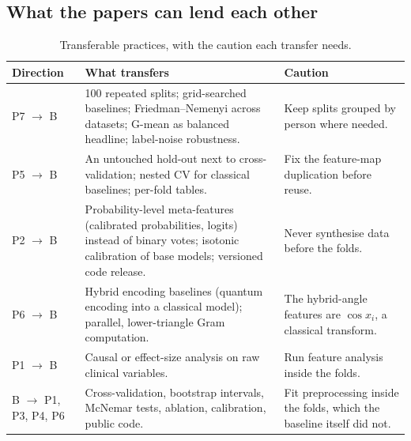 \documentclass[11pt,a4paper]{article}
\begin{document}
\subsection{What the papers can lend each other}
\label{sec:lessons}
\begin{table}[H]
\centering\footnotesize
\caption{Transferable practices, with the caution each transfer needs.}
\begin{tabularx}{\textwidth}{L{2.6cm} Y Y}
\toprule
Direction & What transfers & Caution \\
\midrule
P7 $\to$ B & 100 repeated splits; grid-searched baselines; Friedman--Nemenyi across datasets; G-mean as balanced headline; label-noise robustness. & Keep splits grouped by person where needed. \\
P5 $\to$ B & An untouched hold-out next to cross-validation; nested CV for classical baselines; per-fold tables. & Fix the feature-map duplication before reuse. \\
P2 $\to$ B & Probability-level meta-features (calibrated probabilities, logits) instead of binary votes; isotonic calibration of base models; versioned code release. & Never synthesise data before the folds. \\
P6 $\to$ B & Hybrid encoding baselines (quantum encoding into a classical model); parallel, lower-triangle Gram computation. & The hybrid-angle features are $\cos x_i$, a classical transform. \\
P1 $\to$ B & Causal or effect-size analysis on raw clinical variables. & Run feature analysis inside the folds. \\
B $\to$ P1, P3, P4, P6 & Cross-validation, bootstrap intervals, McNemar tests, ablation, calibration, public code. & Fit preprocessing inside the folds, which the baseline itself did not. \\
\bottomrule
\end{tabularx}
\end{table}

\end{document}
